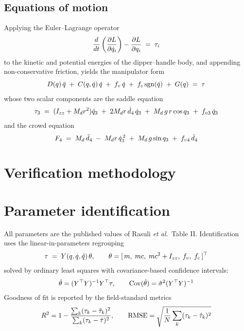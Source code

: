 \documentclass[11pt,a4paper]{article}
\begin{document}
\subsection{Equations of motion}
Applying the Euler--Lagrange operator
\begin{equation}\eqEL\label{eq:el}\end{equation}
to the kinetic and potential energies of the dipper--handle body, and
appending non-conservative friction, yields the manipulator form
\begin{equation}\eqManip\label{eq:manip}\end{equation}
whose two scalar components are the saddle equation
\begin{equation}\eqSaddle\label{eq:saddle}\end{equation}
and the crowd equation
\begin{equation}\eqCrowd\label{eq:crowd}\end{equation}

\section{Verification methodology}                 %

\section{Parameter identification}                 %
All parameters are the published values of Rasuli \emph{et al.}\ Table II.
Identification uses the linear-in-parameters regrouping
\begin{equation}\eqRegressor\label{eq:regressor}\end{equation}
solved by ordinary least squares with covariance-based confidence intervals:
\begin{equation}\eqLS\label{eq:ls}\end{equation}
Goodness of fit is reported by the field-standard metrics
\begin{equation}\eqMetrics\label{eq:metrics}\end{equation}
\end{document}
